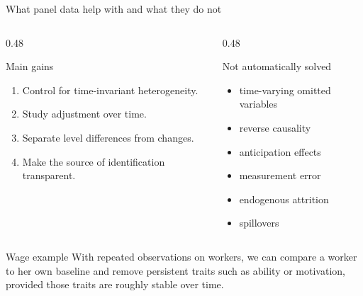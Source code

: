 \documentclass[10pt]{beamer}
\begin{document}
\begin{frame}{What panel data help with and what they do not}
\label{slide:proscons}
\small
\begin{columns}[T]
\begin{column}{0.48\textwidth}
\begin{block}{Main gains}
\begin{enumerate}
  \item Control for time-invariant heterogeneity.
  \item Study adjustment over time.
  \item Separate level differences from changes.
  \item Make the source of identification transparent.
\end{enumerate}
\end{block}
\end{column}
\begin{column}{0.48\textwidth}
\begin{alertblock}{Not automatically solved}
\begin{itemize}
  \item time-varying omitted variables
  \item reverse causality
  \item anticipation effects
  \item measurement error
  \item endogenous attrition
  \item spillovers
\end{itemize}
\end{alertblock}
\end{column}
\end{columns}

\pause
\begin{exampleblock}{Wage example}
With repeated observations on workers, we can compare a worker to her own baseline and remove persistent traits such as ability or motivation, provided those traits are roughly stable over time.
\end{exampleblock}
\end{frame}
\end{document}

